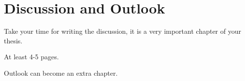 
\chapter{Discussion and Outlook}
  \label{Discussion}

Take your time for writing the discussion, it is a very important chapter of your thesis.

At least 4-5 pages.

\bigskip
Outlook can become an extra chapter.

